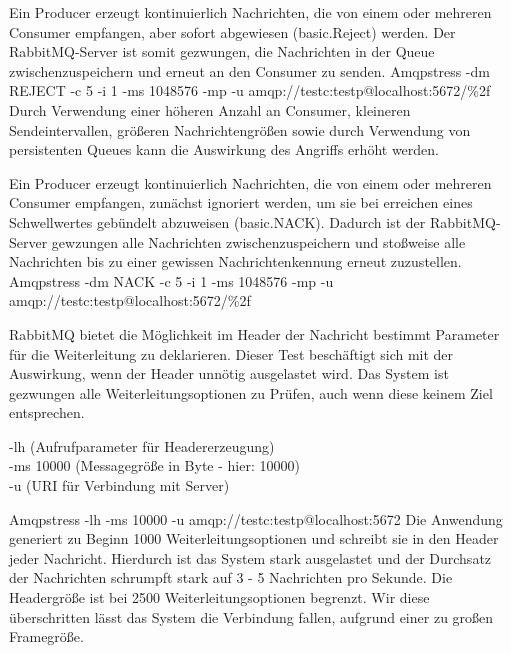 \documentclass[	a4paper,
			11pt,
			titlepage,
			oneside,
			fleqn,
			listof=totoc,
			parskip,
			chapterprefix=false,
			numbers=noenddot]{scrreprt}
\begin{document}
	
		{Ein Producer erzeugt kontinuierlich Nachrichten, die von einem oder mehreren Consumer empfangen, aber sofort abgewiesen (basic.Reject) werden.%
		 Der RabbitMQ-Server ist somit gezwungen, die Nachrichten in der Queue zwischenzuspeichern und erneut an den Consumer zu senden.}%
		{}%
		{Amqpstress -dm REJECT -c 5 -i 1 -ms 1048576 -mp -u amqp://testc:testp@localhost:5672/\%2f}%
		{}%
		{Durch Verwendung einer höheren Anzahl an Consumer, kleineren Sendeintervallen, größeren Nachrichtengrößen sowie durch Verwendung von persistenten %
		Queues kann die Auswirkung des Angriffs erhöht werden.}
	
	
		{Ein Producer erzeugt kontinuierlich Nachrichten, die von einem oder mehreren Consumer empfangen, zunächst ignoriert werden, um sie bei erreichen eines Schwellwertes gebündelt abzuweisen (basic.NACK). Dadurch ist der RabbitMQ-Server gewzungen alle Nachrichten zwischenzuspeichern und stoßweise alle Nachrichten bis zu einer gewissen Nachrichtenkennung erneut zuzustellen.}%
		{}%
		{Amqpstress -dm NACK -c 5 -i 1 -ms 1048576 -mp -u amqp://testc:testp@localhost:5672/\%2f}%
		{}
		
		
		{RabbitMQ bietet die Möglichkeit im Header der Nachricht bestimmt Parameter für die Weiterleitung zu deklarieren. Dieser Test beschäftigt sich mit der Auswirkung, wenn der Header unnötig ausgelastet wird. Das System ist gezwungen alle Weiterleitungsoptionen zu Prüfen, auch wenn diese keinem Ziel entsprechen.}%
		{\parbox[c][1.3cm][c]{10.5cm}{-lh (Aufrufparameter für Headererzeugung) \\ -ms 10000 (Messagegröße in Byte - hier: 10000) \\ -u (URI für Verbindung mit Server)}}%
		{Amqpstress -lh -ms 10000 -u amqp://testc:testp@localhost:5672}%
		{Die Anwendung generiert zu Beginn 1000 Weiterleitungsoptionen und schreibt sie in den Header jeder Nachricht. Hierdurch ist das System stark ausgelastet und der Durchsatz der Nachrichten schrumpft stark auf 3 - 5 Nachrichten pro Sekunde.}
		{Die Headergröße ist bei 2500 Weiterleitungsoptionen begrenzt. Wir diese überschritten lässt das System die Verbindung fallen, aufgrund einer zu großen Framegröße.}
		
\end{document}
